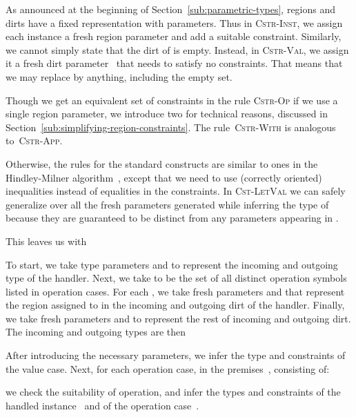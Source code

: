 \documentclass{LMCS}
\newcommand{\rulename}[1]{{\mdseries \small \textsc{#1}}}
\begin{document}
As announced at the beginning of Section~\ref{sub:parametric-types},
regions and dirts have a fixed representation with parameters.
Thus in \rulename{Cstr-Inst}, we assign each instance a fresh region parameter and add a suitable constraint.
Similarly, we cannot simply state that the dirt of  is empty.
Instead, in \rulename{Cstr-Val}, we assign it a fresh dirt parameter~
that needs to satisfy no constraints.
That means that we may replace  by anything, including the empty set.

Though we get an equivalent set of constraints in the rule \rulename{Cstr-Op}
if we use a single region parameter,
we introduce two for technical reasons, discussed in Section~\ref{sub:simplifying-region-constraints}.
The rule~\rulename{Cstr-With} is analogous to~\rulename{Cstr-App}.

Otherwise, the rules for the standard constructs are
similar to ones in the Hindley-Milner algorithm~\cite[p.~322]{pierce2002types},
except that we need to use (correctly oriented) inequalities instead of equalities in the constraints.
In \rulename{Cst-LetVal} we can safely generalize over all the fresh parameters  generated
while inferring the type of  because they are guaranteed to be distinct from any parameters appearing in .

This leaves us with

To start, we take type parameters  and  to represent the incoming and outgoing type of the handler.
Next, we take  to be the set of all distinct operation symbols listed in operation cases.
For each , we take fresh parameters  and 
that represent the region assigned to  in the incoming and outgoing dirt of the handler.
Finally, we take fresh parameters  and  to represent the rest of incoming and outgoing dirt.
The incoming and outgoing types are then

After introducing the necessary parameters, we infer the type and constraints of the value case.
Next, for each operation case, in the premises~, consisting of:

we check the suitability of operation,
and infer the types and constraints of the handled instance~ and of the operation case~.
\end{document}
